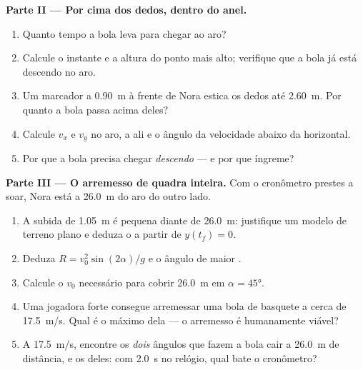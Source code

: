 \begin{problem}
\medskip\noindent\textbf{Parte II --- Por cima dos dedos, dentro do anel.}
\begin{enumerate}[resume]
  \item Quanto tempo a bola leva para chegar ao aro?
  \item Calcule o instante e a altura do ponto mais alto; verifique que a bola já está
        descendo no aro.
  \item Um marcador a \qty{0.90}{m} à frente de Nora estica os dedos até
        \qty{2.60}{m}. Por quanto a bola passa acima deles?
  \item Calcule $v_x$ e $v_y$ no aro, a  ali e o ângulo da
        velocidade abaixo da horizontal.
  \item Por que a bola precisa chegar \emph{descendo} --- e por que íngreme?
\end{enumerate}

\medskip\noindent\textbf{Parte III --- O arremesso de quadra inteira.} Com o
cronômetro prestes a soar, Nora está a \qty{26.0}{m} do aro do outro lado.
\begin{enumerate}[resume]
  \item A subida de \qty{1.05}{m} é pequena diante de \qty{26.0}{m}: justifique um
        modelo de terreno plano e deduza o  a partir de $y(t_f) = 0$.
  \item Deduza $R = v_0^2\sin(2\alpha)/g$ e o ângulo de maior .
  \item Calcule o $v_0$ necessário para cobrir \qty{26.0}{m} em $\alpha = \ang{45}$.
  \item Uma jogadora forte consegue arremessar uma bola de basquete a cerca de
        \qty{17.5}{m/s}. Qual é o  máximo dela --- o arremesso é humanamente
        viável?
  \item A \qty{17.5}{m/s}, encontre os \emph{dois} ângulos que fazem a bola cair a
        \qty{26.0}{m} de distância, e os  deles: com \qty{2.0}{s} no
        relógio, qual bate o cronômetro?
\end{enumerate}


\end{problem}
